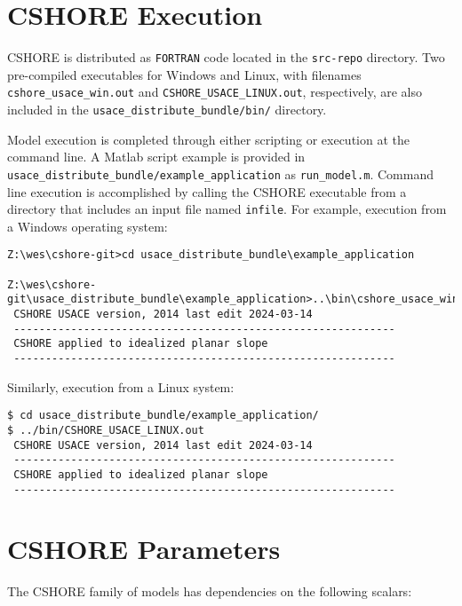 \documentclass[11pt,oneside]{book}
\begin{document}
\section*{CSHORE Execution}
CSHORE is distributed as \verb+FORTRAN+ code located  in the \verb+src-repo+
directory.  Two pre-compiled executables for Windows and Linux, with
filenames \verb+cshore_usace_win.out+ and
\verb+CSHORE_USACE_LINUX.out+, respectively, are also included in the
\verb+usace_distribute_bundle/bin/+ directory.

Model execution is completed through either scripting or execution at
the command line.  A Matlab script example is provided in
\verb+usace_distribute_bundle/example_application+ as
\verb+run_model.m+.  Command line execution is accomplished by calling
the CSHORE executable from a directory that includes an input file
named \verb+infile+.  For example, execution from a Windows operating system:
\begin{verbatim}
Z:\wes\cshore-git>cd usace_distribute_bundle\example_application

Z:\wes\cshore-git\usace_distribute_bundle\example_application>..\bin\cshore_usace_win.out
 CSHORE USACE version, 2014 last edit 2024-03-14
 ------------------------------------------------------------
 CSHORE applied to idealized planar slope
 ------------------------------------------------------------
\end{verbatim}

Similarly, execution from a Linux system:

\begin{verbatim}
$ cd usace_distribute_bundle/example_application/
$ ../bin/CSHORE_USACE_LINUX.out 
 CSHORE USACE version, 2014 last edit 2024-03-14                       
 ------------------------------------------------------------          
 CSHORE applied to idealized planar slope                              
 ------------------------------------------------------------          
\end{verbatim}

\section*{CSHORE Parameters}

\noindent The CSHORE family of models has dependencies on the following scalars:
\end{document}
